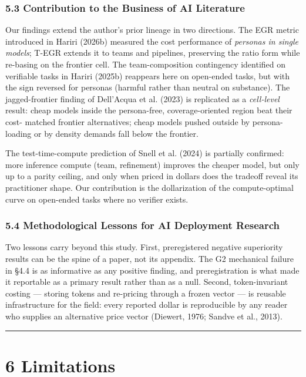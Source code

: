 \documentclass[11pt,a4paper]{article}
\begin{document}
\subsubsection{5.3 Contribution to the Business of AI Literature}

Our findings extend the author's prior lineage in two directions.
The EGR metric introduced in Hariri (2026b) measured the cost
performance of \textit{personas in single models}; T-EGR extends it to
teams and pipelines, preserving the ratio form while re-basing on
the frontier cell. The team-composition contingency identified on
verifiable tasks in Hariri (2025b) reappears here on open-ended
tasks, but with the sign reversed for personas (harmful rather than
neutral on substance). The jagged-frontier finding of Dell'Acqua et
al. (2023) is replicated as a \textit{cell-level} result: cheap models
inside the persona-free, coverage-oriented region beat their cost-
matched frontier alternatives; cheap models pushed outside by
persona-loading or by density demands fall below the frontier.

The test-time-compute prediction of Snell et al. (2024) is partially
confirmed: more inference compute (team, refinement) improves the
cheaper model, but only up to a parity ceiling, and only when priced
in dollars does the tradeoff reveal its practitioner shape. Our
contribution is the dollarization of the compute-optimal curve on
open-ended tasks where no verifier exists.

\subsubsection{5.4 Methodological Lessons for AI Deployment Research}

Two lessons carry beyond this study. First, preregistered negative
superiority results can be the spine of a paper, not its appendix.
The G2 mechanical failure in §4.4 is as informative as any positive
finding, and preregistration is what made it reportable as a primary
result rather than as a null. Second, token-invariant costing —
storing tokens and re-pricing through a frozen vector — is reusable
infrastructure for the field: every reported dollar is reproducible
by any reader who supplies an alternative price vector (Diewert,
1976; Sandve et al., 2013).

\hrule


\section{6 Limitations}
\end{document}
